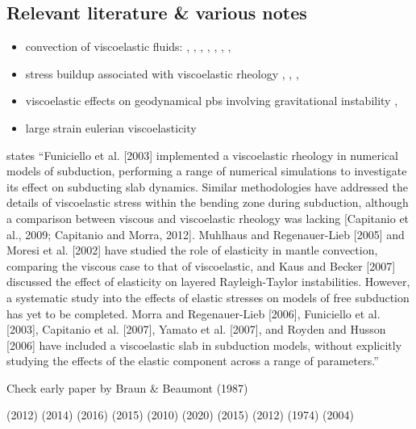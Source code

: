 \subsection{Relevant literature \& various notes}



\begin{itemize}
\item convection of viscoelastic fluids: 
\textcite{hard91}, \textcite{momy93}, 
\textcite{zhgm96}, \textcite{modm02}, 
\textcite{mure05}, \textcite{likh05a},  
\textcite{likh05b}, \textcite{fukk08}


\item stress buildup associated with viscoelastic rheology 
\textcite{kubo77}, \textcite{kupa84}, \textcite{pocp93}, \textcite{mapo09}

\item viscoelastic effects on geodynamical pbs involving gravitational instability 
\textcite{pocp93,kabe07,bumo08,scbe08}, 
\textcite{hamy95} 

\item large strain  eulerian viscoelasticity 
\textcite{scps01,vapy01,coll06,moql07,fukk08,poso08}

\end{itemize}

\textcite{famc14} states 
``Funiciello et al. [2003] implemented a viscoelastic rheology in numerical models of subduction, performing a
range of numerical simulations to investigate its effect on subducting slab dynamics. Similar methodologies have addressed the details of viscoelastic stress within the bending zone during subduction, although a comparison between viscous and viscoelastic rheology was lacking [Capitanio et al., 2009; Capitanio and Morra, 2012].
Muhlhaus and Regenauer-Lieb [2005] and Moresi et al. [2002] have studied the role of elasticity in mantle convection, comparing the viscous case to that of viscoelastic, and Kaus and Becker [2007] discussed the effect of elasticity on layered Rayleigh-Taylor instabilities. However, a systematic study into the effects of elastic stresses on models of free subduction has yet to be completed. Morra and Regenauer-Lieb [2006], Funiciello et al. [2003], Capitanio et al. [2007], Yamato et al. [2007], and Royden and Husson [2006] have included a viscoelastic slab in subduction models, without explicitly studying the effects of the elastic component across a range of parameters.''


Check early paper by Braun \& Beaumont (1987) \cite{brbe87}

\textcite{asmo12} (2012)
\textcite{hepk14} (2014)
\textcite{daws16} (2016)
\textcite{thkp15} (2015)
\textcite{beps10} (2010)
\textcite{samb20} (2020)
\textcite{vosc15} (2015)
\textcite{nalr12} (2012)
\textcite{pelt74} (1974)
\textcite{kaps04} (2004)
